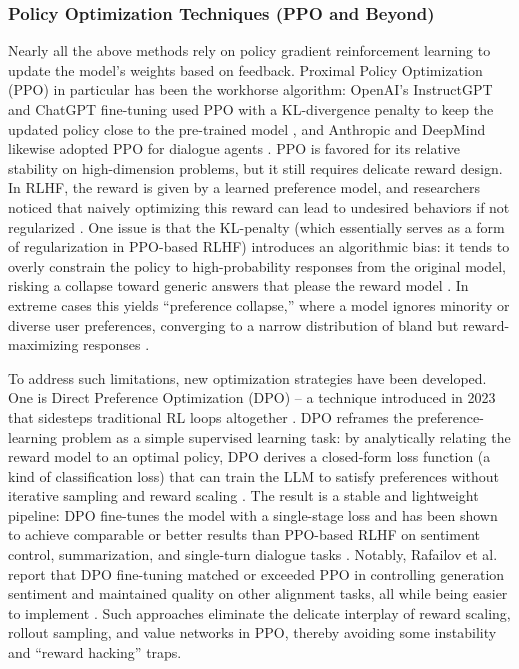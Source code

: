\documentclass{article}
\begin{document}
\subsubsection{Policy Optimization Techniques (PPO and Beyond)}

Nearly all the above methods rely on policy gradient reinforcement learning to update the model’s weights based on feedback. Proximal Policy Optimization (PPO) in particular has been the workhorse algorithm: OpenAI’s InstructGPT and ChatGPT fine-tuning used PPO with a KL-divergence penalty to keep the updated policy close to the pre-trained model  , and Anthropic and DeepMind likewise adopted PPO for dialogue agents  . PPO is favored for its relative stability on high-dimension problems, but it still requires delicate reward design. In RLHF, the reward is given by a learned preference model, and researchers noticed that naively optimizing this reward can lead to undesired behaviors if not regularized  . One issue is that the KL-penalty (which essentially serves as a form of regularization in PPO-based RLHF) introduces an algorithmic bias: it tends to overly constrain the policy to high-probability responses from the original model, risking a collapse toward generic answers that please the reward model . In extreme cases this yields “preference collapse,” where a model ignores minority or diverse user preferences, converging to a narrow distribution of bland but reward-maximizing responses .

To address such limitations, new optimization strategies have been developed. One is Direct Preference Optimization (DPO) – a technique introduced in 2023 that sidesteps traditional RL loops altogether  . DPO reframes the preference-learning problem as a simple supervised learning task: by analytically relating the reward model to an optimal policy, DPO derives a closed-form loss function (a kind of classification loss) that can train the LLM to satisfy preferences without iterative sampling and reward scaling  . The result is a stable and lightweight pipeline: DPO fine-tunes the model with a single-stage loss and has been shown to achieve comparable or better results than PPO-based RLHF on sentiment control, summarization, and single-turn dialogue tasks . Notably, Rafailov et al. report that DPO fine-tuning matched or exceeded PPO in controlling generation sentiment and maintained quality on other alignment tasks, all while being easier to implement . Such approaches eliminate the delicate interplay of reward scaling, rollout sampling, and value networks in PPO, thereby avoiding some instability and “reward hacking” traps.
\end{document}
